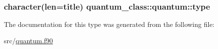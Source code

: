 \hypertarget{structquantum__class_1_1quantum_aa222a9bd02a7dd3f8b37cdbcd33a6d74}{
\subsubsection[{type}]{\setlength{\rightskip}{0pt plus 5cm}character(len=title) quantum\+\_\+class\+::quantum\+::type\hspace{0.3cm}{\ttfamily [private]}}}\label{structquantum__class_1_1quantum_aa222a9bd02a7dd3f8b37cdbcd33a6d74}


The documentation for this type was generated from the following file\+:\begin{DoxyCompactItemize}
\item 
src/\hyperlink{quantum_8f90}{quantum.\+f90}\end{DoxyCompactItemize}
